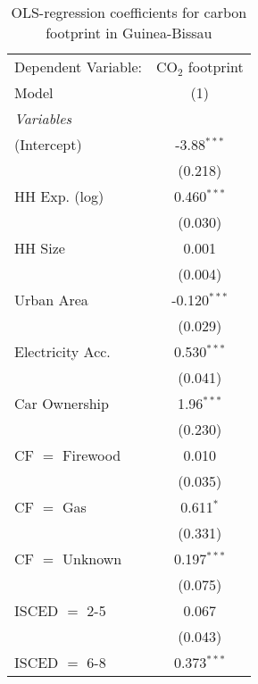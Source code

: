 
\begin{table}[htbp!]
   \centering
   \small
   \begin{adjustbox}{width = 1\textwidth, max height = 0.95\textheight, center}
      \begin{threeparttable}[b]
         \caption{\label{tab:OLS_2_GNB} OLS-regression coefficients for carbon footprint in Guinea-Bissau}
         \begin{tabular}{lc}
            \tabularnewline \midrule \midrule
            Dependent Variable: & CO$_{2}$ footprint\\  
            Model               & (1)\\  
            \midrule
            \emph{Variables}\\
            (Intercept)         & -3.88$^{***}$\\   
                                & (0.218)\\   
            HH Exp. (log)       & 0.460$^{***}$\\   
                                & (0.030)\\   
            HH Size             & 0.001\\   
                                & (0.004)\\   
            Urban Area          & -0.120$^{***}$\\   
                                & (0.029)\\   
            Electricity Acc.    & 0.530$^{***}$\\   
                                & (0.041)\\   
            Car Ownership       & 1.96$^{***}$\\   
                                & (0.230)\\   
            CF $=$ Firewood     & 0.010\\   
                                & (0.035)\\   
            CF $=$ Gas          & 0.611$^{*}$\\   
                                & (0.331)\\   
            CF $=$ Unknown      & 0.197$^{***}$\\   
                                & (0.075)\\   
            ISCED $=$ 2-5       & 0.067\\   
                                & (0.043)\\   
            ISCED $=$ 6-8       & 0.373$^{***}$\\   

\end{tabular}
\end{threeparttable}
\end{adjustbox}
\end{table}
